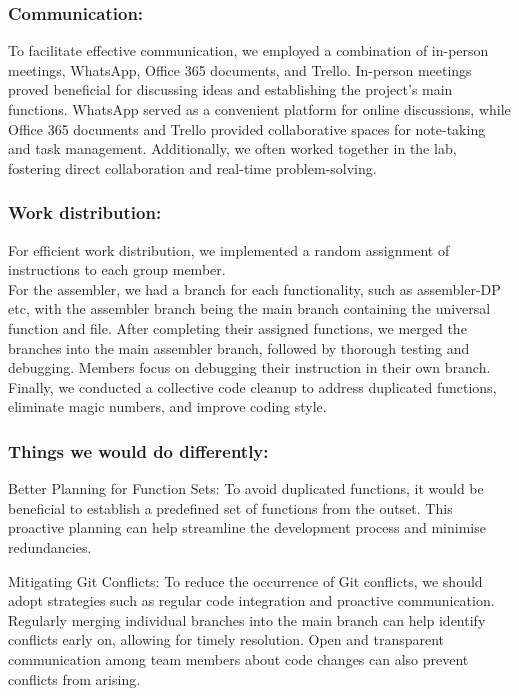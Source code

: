 \documentclass{article}
\begin{document}
\subsubsection{Communication:}

To facilitate effective communication, we employed a combination of in-person meetings, WhatsApp, Office 365 documents, and Trello. In-person meetings proved beneficial for discussing ideas and establishing the project's main functions. WhatsApp served as a convenient platform for online discussions, while Office 365 documents and Trello provided collaborative spaces for note-taking and task management. Additionally, we often worked together in the lab, fostering direct collaboration and real-time problem-solving. 

\subsubsection{Work distribution:}

For efficient work distribution, we implemented a random assignment of instructions to each group member.\\
For the assembler, we had a branch for each functionality, such as assembler-DP etc, with the assembler branch being the main branch containing the universal function and file. After completing their assigned functions, we merged the branches into the main assembler branch, followed by thorough testing and debugging. Members focus on debugging their instruction in their own branch. Finally, we conducted a collective code cleanup to address duplicated functions, eliminate magic numbers, and improve coding style. 

\subsubsection{Things we would do differently:}

Better Planning for Function Sets: To avoid duplicated functions, it would be beneficial to establish a predefined set of functions from the outset. This proactive planning can help streamline the development process and minimise redundancies. 

Mitigating Git Conflicts: To reduce the occurrence of Git conflicts, we should adopt strategies such as regular code integration and proactive communication. Regularly merging individual branches into the main branch can help identify conflicts early on, allowing for timely resolution. Open and transparent communication among team members about code changes can also prevent conflicts from arising. 
\end{document}

